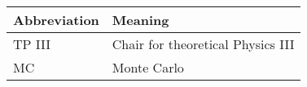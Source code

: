 \noindent\\\\

\begin{tabular}[h]{p{3cm}|l}
	Abbreviation & Meaning\\        
	\midrule 
	TP III & Chair for theoretical Physics III\\
	MC & Monte Carlo\\
\end{tabular}\\\\

\newpage